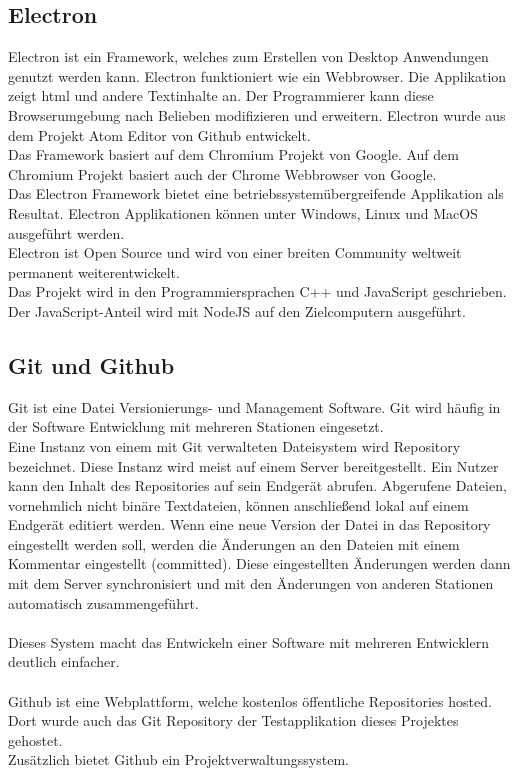 \documentclass[11pt]{scrartcl}
\begin{document}
\subsection{Electron}
Electron ist ein Framework, welches zum Erstellen von Desktop Anwendungen genutzt werden kann. Electron funktioniert
wie ein Webbrowser. Die Applikation zeigt \ac{html} und andere Textinhalte an.\cite{electron} Der Programmierer kann diese
Browserumgebung nach Belieben modifizieren und erweitern. Electron wurde aus dem Projekt Atom Editor von Github entwickelt.\\
Das Framework basiert auf dem Chromium Projekt von Google. Auf dem Chromium Projekt basiert auch der Chrome Webbrowser von
Google.\\
Das Electron Framework bietet eine betriebssystemübergreifende Applikation als Resultat. Electron Applikationen können unter
Windows, Linux und MacOS ausgeführt werden.\\
Electron ist Open Source und wird von einer breiten Community weltweit permanent weiterentwickelt.\cite{electron}\\
Das Projekt wird in den Programmiersprachen C++ und JavaScript geschrieben.\\
Der JavaScript-Anteil wird mit NodeJS auf den Zielcomputern ausgeführt.

\subsection{Git und Github}
Git ist eine Datei Versionierungs- und Management Software. Git wird häufig in der Software Entwicklung mit mehreren Stationen eingesetzt.\\
Eine Instanz von einem mit Git verwalteten Dateisystem wird Repository bezeichnet. Diese Instanz wird meist auf einem Server bereitgestellt.
Ein Nutzer kann den Inhalt des Repositories auf sein Endgerät abrufen.
Abgerufene Dateien, vornehmlich nicht binäre Textdateien, können anschließend lokal auf einem Endgerät editiert werden. Wenn eine neue Version
der Datei in das Repository eingestellt werden soll, werden die Änderungen an den Dateien mit einem Kommentar eingestellt (committed).
Diese eingestellten Änderungen werden dann mit dem Server synchronisiert und mit den Änderungen von anderen Stationen automatisch zusammengeführt.\\
\\
Dieses System macht das Entwickeln einer Software mit mehreren Entwicklern deutlich einfacher.\\
\\
Github ist eine Webplattform, welche kostenlos öffentliche Repositories hosted. Dort wurde auch das Git Repository der Testapplikation
dieses Projektes gehostet.\\
Zusätzlich bietet Github ein Projektverwaltungssystem.
\clearpage
\end{document}
